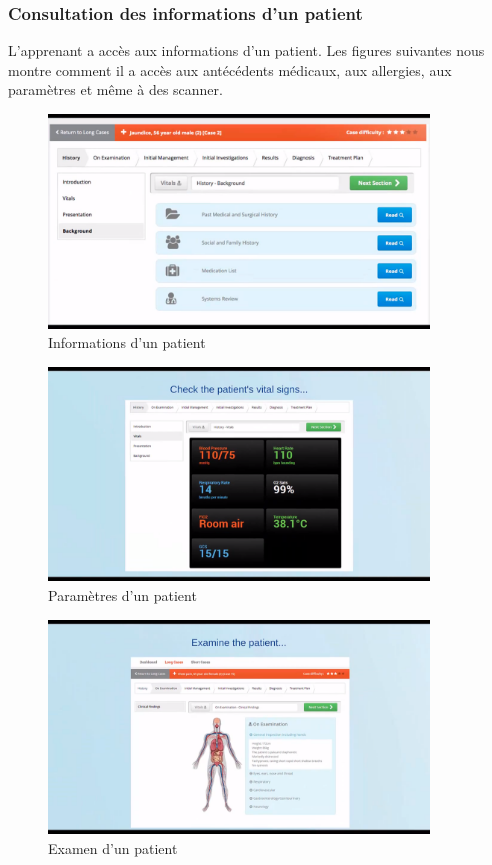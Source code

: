 \subsubsection{Consultation des informations d'un patient}
L'apprenant a accès aux informations d'un patient. Les figures suivantes nous montre comment il a accès aux antécédents médicaux, aux allergies, aux paramètres et même à des scanner.
\begin{figure}
    \centering
    \includegraphics[width=0.9\textwidth]{figures/met/infos patient.png}
    \captionsetup{justification=centering}
    \caption{Informations d'un patient}
\end{figure}

\begin{figure}
    \centering
    \includegraphics[width=0.9\textwidth]{figures/met/params.png}
    \captionsetup{justification=centering}
    \caption{Paramètres d'un patient}
\end{figure}

\begin{figure}
    \centering
    \includegraphics[width=0.9\textwidth]{figures/met/exam.png}
    \captionsetup{justification=centering}
    \caption{Examen d'un patient}
\end{figure}

